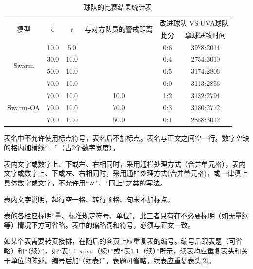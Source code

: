 \begin{table}[htbp]
    \centering
    \small
	\caption[表3.2]{球队的比赛结果统计表}
	\label{tab:3.2}
	\begin{tabular}{cccccc}
		\hline
		\multirow{2}{*}{模型}       & \multirow{2}{*}{d} & \multirow{2}{*}{r} & \multirow{2}{*}{与对方队员的警戒距离} & \multicolumn{2}{c}{改进球队 VS UVA球队} \\ \cline{5-6} 
		&                    &                    &                             & 比分           & 拿球进攻时间      \\ \hline
		\multirow{4}{*}{Swarm}    & 10.0               & 5.0                &              & 0:6          & 3978:2014 \\ 
		& 30.0               & 10.0               &                             & 0:4          & 2754:3010          \\ 
		& 50.0               & 10.0               &                             & 0:5          & 3174:2806          \\  
		& 70.0               & 10.0               &                             & 0:0          & 3113:2856          \\\hline
		\multirow{3}{*}{Swarm-OA} & 70.0               & 10.0               & 10.0                        & 1:2          & 3132:2794          \\
		& 70.0               & 10.0               & 70.0                        & 0:3          & 3180:2772          \\
		& 70.0               & 10.0               & 50.0                        & 0:1          & 2858:3012         \\ \hline
	\end{tabular} 
\end{table}

表名中不允许使用标点符号，表名后不加标点。表名与正文之间空一行。数字空缺的格内加横线“－”（占2个数字宽度）。

表内文字或数字上、下或左、右相同时，采用通栏处理方式（合并单元格），表内文字或数字上、下或左、右相同时，采用通栏处理方式(合并单元格)，或一律填上具体数字或文字，不允许用“〃”、“同上”之类的写法。

表内文字说明，起行空一格、转行顶格、句末不加标点。

表的各栏应标明“量、标准规定符号、单位”。此三者只有在不必要标明（如无量纲等）情况下方可省略。表中的缩略词和符号，必须与正文一致。

如某个表需要转页接排，在随后的各页上应重复表的编号。编号后跟表题（可省略）和“（续）”，如“表1.1 xxxx（续）”或“表1.1（续）”所示，续表均应重复表头和关于单位的陈述。编号后加“（续表）”，表题可省略。续表应重复表头[2]。
 
